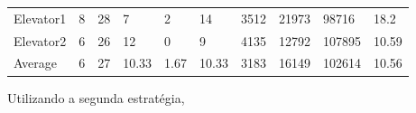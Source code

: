 \documentclass[a4paper]{article}
\begin{document}
\begin{table}[h]
\begin{tabular}{@{}llllllllll@{}}
Elevator1 & 8        & 28            & 7           & 2                                                               & 14                                                                  & 3512                                                         & 21973                                                 & 98716                                                   & 18.2        \\
Elevator2 & 6        & 26            & 12           & 0                                                               & 9                                                                  & 4135                                                         & 12792                                                 & 107895                                                   & 10.59         \\
Average   & 6     & 27         & 10.33        & 1.67                                                               & 10.33                                                               & 3183                                                         & 16149                                                 & 102614                                                   & 10.56          \\ \bottomrule
\end{tabular}
\end{table}

Utilizando a segunda estratégia,
\end{document}

